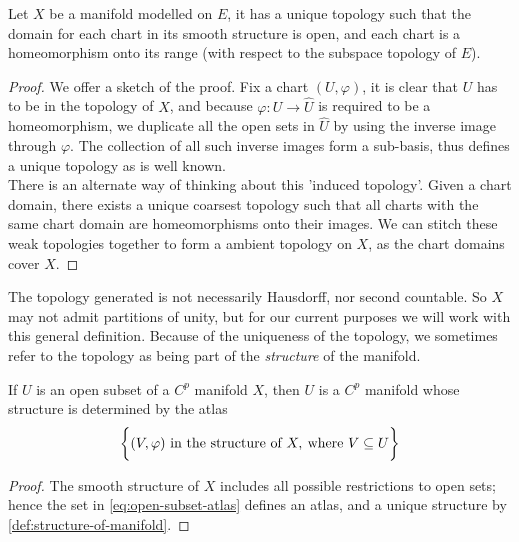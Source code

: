 \documentclass[../main-manifolds.tex]{subfiles}
\begin{document}
\begin{wts}\label{def:topology-unique-on-manifold}
    Let $X$ be a manifold modelled on $E$, it has a unique topology such that the domain for each chart in its smooth structure is open, and each chart is a homeomorphism onto its range (with respect to the subspace topology of $E$).
\end{wts}
\begin{proof}
    We offer a sketch of the proof. Fix a chart $(U,\varphi)$, it is clear that $U$ has to be in the topology of $X$, and because $\varphi: U\to \hat{U}$ is required to be a homeomorphism, we duplicate all the open sets in $\hat{U}$ by using the inverse image through $\varphi$. The collection of all such inverse images form a sub-basis, thus defines a unique topology as is well known.\\

    There is an alternate way of thinking about this 'induced topology'. Given a chart domain, there exists a unique coarsest topology such that all charts with the same chart domain are homeomorphisms onto their images. We can stitch these weak topologies together to form a ambient topology on $X$, as the chart domains cover $X$.
\end{proof}
\begin{remark}
    The topology generated is not necessarily Hausdorff, nor second countable. So $X$ may not admit partitions of unity, but for our current purposes we will work with this general definition. Because of the uniqueness of the topology, we sometimes refer to the topology as being part of the \emph{structure} of the manifold.
\end{remark}
\begin{wts}\label{prop:open-subsets-of-manifolds}
    If $U$ is an open subset of a $C^p$ manifold $X$, then $U$ is a $C^p$ manifold whose structure is determined by the atlas
    \begin{equation}\label{eq:open-subset-atlas}
    \biggl\{{(V,\varphi) \text{ in the structure of }X,\:\text{where } V\subseteq U}\biggr\}
    \end{equation}
\end{wts}
\begin{proof}
    The smooth structure of $X$ includes all possible restrictions to open sets; hence the set in \cref{eq:open-subset-atlas} defines an atlas, and a unique structure by \cref{def:structure-of-manifold}.
\end{proof}
\end{document}
